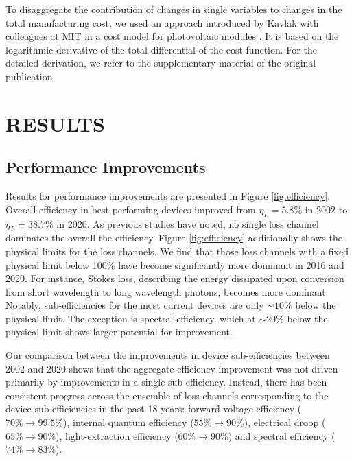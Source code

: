 \documentclass[a4paper,nocompress]{spie}  %
\begin{document}
        To disaggregate the contribution of changes in single variables to changes in the total manufacturing cost, we used an approach introduced by Kavlak with colleagues at MIT in a cost model for photovoltaic modules \cite{kavlak2018evaluating}. It is based on the logarithmic derivative of the total differential of the cost function. For the detailed derivation, we refer to the supplementary material of the original publication.

\section{RESULTS}

\subsection{Performance Improvements}

     Results for performance improvements are presented in Figure \ref{fig:efficiency}. Overall efficiency in best performing devices improved from $\eta_L=5.8\%$ in 2002 to $\eta_L = 38.7\%$ in 2020. As previous studies have noted, no single loss channel dominates the overall the efficiency\cite{tsao2010solid}. Figure \ref{fig:efficiency} additionally shows the physical limits for the loss channels. We find that those loss channels with a fixed physical limit below 100\% have become significantly more dominant in 2016 and 2020. For instance, Stokes loss, describing the energy dissipated upon conversion from short wavelength to long wavelength photons, becomes more dominant. Notably, sub-efficiencies for the most current devices are only $\sim10\%$ below the physical limit. The exception is spectral efficiency, which at $\sim20\%$ below the physical limit shows larger potential for improvement.
     
     Our comparison between the improvements in device sub-efficiencies between 2002 and 2020 shows that the aggregate efficiency improvement was not driven primarily by improvements in a single sub-efficiency. Instead, there has been consistent progress across the ensemble of loss channels corresponding to the device sub-efficiencies in the past 18 years: forward voltage efficiency ($70\%\rightarrow99.5\%$), internal quantum efficiency ($55\%\rightarrow90\%)$, electrical droop ($65\%\rightarrow90\%$), light-extraction efficiency ($60\%\rightarrow90\%$) and spectral efficiency ($74\% \rightarrow83\%$).
     
\end{document}
